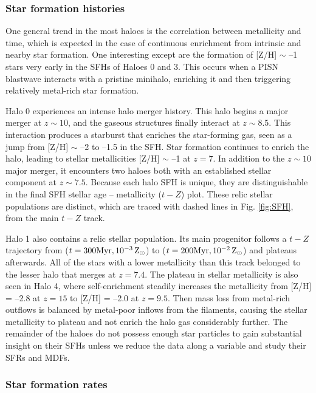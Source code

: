 \documentclass[useAMS,usenatbib]{mn2e}
\begin{document}
\subsubsection{Star formation histories}
\label{sec:SFH}

One general trend in the most haloes is the correlation
between metallicity and time, which is expected in the case of
continuous enrichment from intrinsic and nearby star formation.  One
interesting except are the formation of [Z/H] $\sim$ --1 stars very
early in the SFHs of Haloes 0 and 3.  This occurs when a PISN
blastwave interacts with a pristine minihalo, enriching it and then
triggering relatively metal-rich star formation.

Halo 0 experiences an intense halo merger history.  This halo begins a
major merger at $z \sim 10$, and the gaseous structures finally
interact at $z \sim 8.5$.  This interaction produces a starburst that
enriches the star-forming gas, seen as a jump from [Z/H] $\sim$ --2 to
--1.5 in the SFH.  Star formation continues to enrich the halo,
leading to stellar metallicities [Z/H] $\sim$ --1 at $z=7$.  In
addition to the $z \sim 10$ major merger, it encounters two haloes
both with an established stellar component at $z \sim 7.5$.  Because
each halo SFH is unique, they are distinguishable in the final SFH
stellar age -- metallicity ($t-Z$) plot.  These relic stellar
populations are distinct, which are traced with dashed lines in
Fig. \ref{fig:SFH}, from the main $t-Z$ track.

Halo 1 also contains a relic stellar population.  Its main progenitor
follows a $t-Z$ trajectory from ($t = 300 \mathrm{Myr}, 10^{-3}
{\rm\,Z_\odot}$) to ($t = 200 \mathrm{Myr}, 10^{-2} {\rm\,Z_\odot}$) and plateaus
afterwards.  All of the stars with a lower metallicity than this track
belonged to the lesser halo that merges at $z=7.4$.  The plateau in
stellar metallicity is also seen in Halo 4, where self-enrichment
steadily increases the metallicity from [Z/H] = --2.8 at $z = 15$ to
[Z/H] = --2.0 at $z = 9.5$.  Then mass loss from metal-rich outflows
is balanced by metal-poor inflows from the filaments, causing the
stellar metallicity to plateau and not enrich the halo gas
considerably further.  The remainder of the haloes do not possess
enough star particles to gain substantial insight on their SFHs unless
we reduce the data along a variable and study their SFRs and MDFs.

\subsubsection{Star formation rates}
\end{document}
